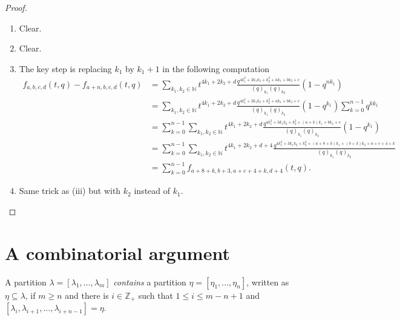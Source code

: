 \documentclass[a4paper, 12pt, reqno]{amsart}
\theoremstyle{remark}
\begin{document}
\begin{proof}\leavevmode
  \begin{enumerate}
  \item Clear.
  \item Clear.
  \item The key step is replacing $k_1$ by $k_1 + 1$ in the following computation
    \begin{align*}
      f_{a, b, c, d}(t, q) - f_{a + n, b, c, d}(t, q) &= \sum_{k_1, k_2 \in \mathbb{N}}t^{4k_1 + 2k_2 + d}\frac{q^{4k_1^2 + 3k_1k_2 + k_2^2 + ak_1 + bk_2 + c}}{(q)_{k_1}(q)_{k_2}}(1 - q^{nk_1}) \\
                                                      &= \sum_{k_1, k_2 \in \mathbb{N}}t^{4k_1 + 2k_2 + d}\frac{q^{4k_1^2 + 3k_1k_2 + k_2^2 + ak_1 + bk_2 + c}}{(q)_{k_1}(q)_{k_2}}(1 - q^{k_1})\sum_{k = 0}^{n - 1}q^{kk_1} \\
                                                      &= \sum_{k = 0}^{n - 1}\sum_{k_1, k_2 \in \mathbb{N}}t^{4k_1 + 2k_2 + d}\frac{q^{4k_1^2 + 3k_1k_2 + k_2^2 + (a + k)k_1 + bk_2 + c}}{(q)_{k_1}(q)_{k_2}}(1 - q^{k_1}) \\
                                                      &= \sum_{k = 0}^{n - 1}\sum_{k_1, k_2 \in \mathbb{N}}t^{4k_1 + 2k_2 + d + 4}\frac{q^{4k_1^2 + 3k_1k_2 + k_2^2 + (a + 8 + k)k_1 + (b + 3)k_2 + a + c + 4 + k}}{(q)_{k_1}(q)_{k_2}} \\
                                                      &= \sum_{k = 0}^{n - 1}f_{a + 8 + k, b + 3, a + c + 4 + k, d + 4}(t, q).
    \end{align*}
  \item Same trick as (iii) but with $k_2$ instead of $k_1$. \qedhere
  \end{enumerate}
\end{proof}

\section{A combinatorial argument}
\label{sec:comb-argum}

A partition $\lambda = [\lambda_1, \dots, \lambda_m]$ \emph{contains} a partition $\eta = [\eta_1, \dots, \eta_n]$, written as $\eta \subseteq \lambda$, if $m \ge n$ and there is $i \in \mathbb{Z}_+$ such that $1 \le i \le m - n + 1$ and $[\lambda_i, \lambda_{i + 1}, \dots, \lambda_{i + n - 1}] = \eta$.
\end{document}
